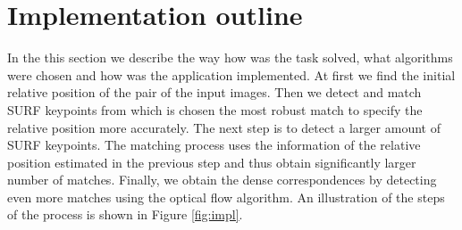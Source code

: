 
\section{Implementation outline}
\label{sec:impl_outline}
In the this section we describe the way how was the task solved, what algorithms were chosen and how was the application implemented.
At first we find the initial relative position of the pair of the input images.
Then we detect and match SURF keypoints from which is chosen the most robust match to specify the relative position more accurately.
The next step is to detect a larger amount of SURF keypoints. 
The matching process uses the information of the relative position estimated in the previous step and thus obtain significantly larger number of matches.
Finally, we obtain the dense correspondences by detecting even more matches using the optical flow algorithm.
An illustration of the steps of the process is shown in Figure \ref{fig:impl}.

